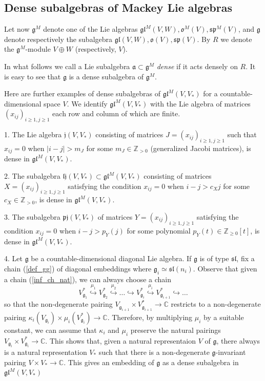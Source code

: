 \documentclass{svmult}
\newcommand {\ZZ} {\mathbb {Z}}
\newcommand {\CC} {\mathbb {C}}
\newcommand{\jj}{\mathfrak{j}}
\renewcommand{\sp}{\mathfrak{sp}}
\renewcommand{\sl}{\mathfrak{sl}}
\newcommand{\oj}{\mathfrak{g}}
\newcommand{\oo}{\mathfrak{o}}
\renewcommand{\aa}{\mathfrak{a}}
\renewcommand{\gg}{\mathfrak{g}}
\newcommand{\gl}{\mathfrak{gl}}
\begin{document}
\subsection{Dense subalgebras of Mackey Lie algebras}\label{sect:7.2}

Let now $\gg^M$ denote one of the Lie algebras $\gl^M(V,W), \oo^M(V), \sp^M(V)$, and $\gg$ denote respectively the subalgebra $\gl(V,W), \oo(V), \sp(V)$.
By $R$ we denote the $\gg^M$-module $V\oplus W$ (respectively, $V$).

In what follows we call a Lie subalgebra 
$\aa\subset \gg^M$ \textit{dense} if it acts densely on $R$.
It is easy to see that $\gg$ is a dense subalgebra of $\gg^M$.

Here are further examples of dense subalgebras of $\gl^M(V,V_*)$ for a countable-dimensional space $V$. We identify $\gl^M(V,V_*)$ with the Lie algebra of matrices $(x_{ij})_{i\geq1,j\geq1}$ each row and column of which are finite. 

1. The Lie algebra $\jj(V,V_*)$ consisting of matrices $J = (x_{ij})_{i\geq1,j\geq1}$ such that $x_{ij}=0$ when 
$|i-j|>m_J$ for some $m_J \in \ZZ_{>0}$ (generalized Jacobi matrices), is dense in $\gl^M(V,V_*)$.

2. The subalgebra $\mathfrak{lj}(V,V_*) \subset \gl^M(V,V_*)$ consisting of matrices $X=(x_{ij})_{i\geq1,j\geq1}$ satisfying the condition $x_{ij}=0$ when $i-j>c_Xj$ for some $c_X \in \ZZ_{>0}$, is dense in $\gl^M(V,V_*)$.

3.  The subalgebra $\mathfrak{pj}(V,V_*)$ of matrices $Y=(x_{ij})_{i\geq1,j\geq1}$ satisfying the condition $x_{ij}=0$ when 
$i-j>p_Y(j)$ for some polynomial $p_Y(t) \in \ZZ_{\geq0}[t]$, is dense in $\gl^M(V,V_*)$.

4. Let $\gg$ be a countable-dimensional diagonal Lie algebra. If $\gg$ is of type $\sl$,  
fix a chain (\ref{def_gg}) of diagonal embeddings where $\gg_i \simeq \sl(n_i)$. Observe that given a chain (\ref{inf_ch_nat}), we can always choose a chain
$$V^*_{\oj_{1}} \stackrel{\mu_1}{\hookrightarrow} V^*_{\oj_{2}} \stackrel{\mu_2}{\hookrightarrow}  \dots \hookrightarrow V^*_{\oj_{i}} \stackrel{\mu_i}{\hookrightarrow} V^*_{\oj_{i+1}} \hookrightarrow \dots$$ so that the non-degenerate pairing 
$V_{\oj_{i+1}} \times V^*_{\oj_{i+1}} \rightarrow \CC$ restricts to a non-degenerate pairing $\kappa_i(V_{\oj_i}) \times \mu_i(V^*_{\oj_i}) \rightarrow \CC$. 
Therefore, by multiplying $\mu_i$ by a suitable constant, we can assume that $\kappa_i$ and $\mu_i$ preserve the natural pairings 
$V_{\oj_i} \times V^*_{\oj_i} \rightarrow \CC$. 
This shows that, given a natural representaion $V$ of $\gg$, there always is a natural representation $V_*$ such that there is a non-degenerate $\oj$-invariant pairing $V \times V_* \rightarrow \CC$. 
This gives an embedding of $\gg$ as a dense subalgebra in $\gl^M(V,V_*)$
\end{document}
